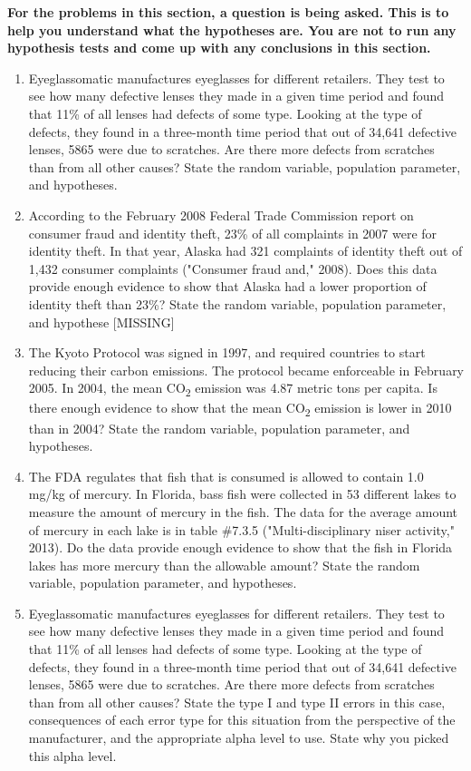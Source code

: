 \documentclass[]{book}
\begin{document}
\textbf{For the problems in this section, a question is being asked. This is
to help you understand what the hypotheses are. You are not to run any
hypothesis tests and come up with any conclusions in this section.}

\begin{enumerate}
\def\labelenumi{\arabic{enumi}.}
\item
  Eyeglassomatic manufactures eyeglasses for different retailers. They test to see how many defective lenses they made in a given time period and found that 11\% of all lenses had defects of some type. Looking at the type of defects, they found in a three-month time period that out of 34,641 defective lenses, 5865 were due to scratches. Are there more defects from scratches than from all other causes? State the random variable, population parameter, and hypotheses.
\item
  According to the February 2008 Federal Trade Commission report on consumer fraud and identity theft, 23\% of all complaints in 2007 were for identity theft. In that year, Alaska had 321 complaints of identity theft out of 1,432 consumer complaints ("Consumer fraud and," 2008). Does this data provide enough evidence to show that Alaska had a lower proportion of identity theft than 23\%? State the random variable, population parameter, and hypothese {[}MISSING{]}
\item
  The Kyoto Protocol was signed in 1997, and required countries to start reducing their carbon emissions. The protocol became enforceable in February 2005. In 2004, the mean CO\textsubscript{2} emission was 4.87 metric tons per capita. Is there enough evidence to show that the mean CO\textsubscript{2} emission is lower in 2010 than in 2004? State the random variable, population parameter, and hypotheses.
\item
  The FDA regulates that fish that is consumed is allowed to contain 1.0 mg/kg of mercury. In Florida, bass fish were collected in 53 different lakes to measure the amount of mercury in the fish. The data for the average amount of mercury in each lake is in table \#7.3.5 ("Multi-disciplinary niser activity," 2013). Do the data provide enough evidence to show that the fish in Florida lakes has more mercury than the allowable amount? State the random variable, population parameter, and hypotheses.
\item
  Eyeglassomatic manufactures eyeglasses for different retailers. They test to see how many defective lenses they made in a given time period and found that 11\% of all lenses had defects of some type. Looking at the type of defects, they found in a three-month time period that out of 34,641 defective lenses, 5865 were due to scratches. Are there more defects from scratches than from all other causes? State the type I and type II errors in this case, consequences of each error type for this situation from the perspective of the manufacturer, and the appropriate alpha level to use. State why you picked this alpha level.

\end{enumerate}
\end{document}
